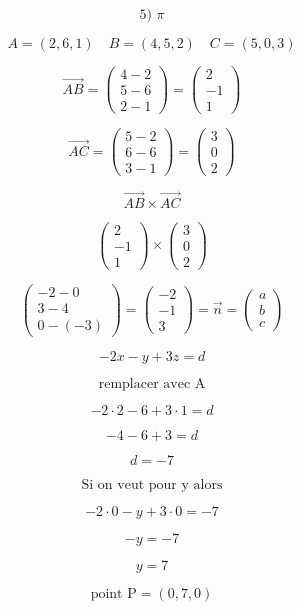 \documentclass{article}
\begin{document}
\[
\text{5) } \pi
\]

\[
A=(2,6,1) \quad B=(4,5,2) \quad C=(5,0,3)
\]

\[
\vec{AB} = \begin{pmatrix} 4-2 \\ 5-6 \\ 2-1 \end{pmatrix} = \begin{pmatrix} 2 \\ -1 \\ 1 \end{pmatrix}
\]

\[
\vec{AC} = \begin{pmatrix} 5-2 \\ 6-6 \\ 3-1 \end{pmatrix} = \begin{pmatrix} 3 \\ 0 \\ 2 \end{pmatrix}
\]

\[
\vec{AB} \times \vec{AC}
\]

\[
\begin{pmatrix} 2 \\ -1 \\ 1 \end{pmatrix} \times \begin{pmatrix} 3 \\ 0 \\ 2 \end{pmatrix}
\]

\[
\begin{pmatrix} -2-0 \\ 3-4 \\ 0-(-3) \end{pmatrix} = \begin{pmatrix} -2 \\ -1 \\ 3 \end{pmatrix} = \vec{n} = \begin{pmatrix} a \\ b \\ c \end{pmatrix}
\]

\[
-2x - y + 3z = d
\]

\[
\text{remplacer avec A}
\]

\[
-2 \cdot 2 - 6 + 3 \cdot 1 = d
\]

\[
-4 - 6 + 3 = d
\]

\[
d = -7
\]

\[
\text{Si on veut pour y alors}
\]

\[
-2 \cdot 0 - y + 3 \cdot 0 = -7
\]

\[
-y = -7
\]

\[
y = 7
\]

\[
\text{point P} = (0, 7, 0)
\]
\end{document}
